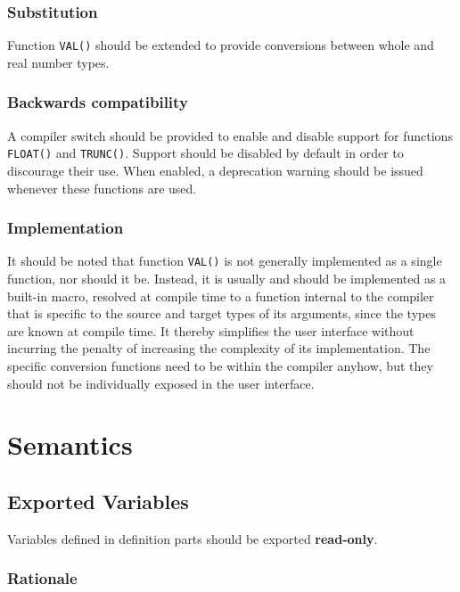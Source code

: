 \documentclass[10pt,a4paper]{article}
\begin{document}
\subsubsection{Substitution}

Function \verb|VAL()| should be extended to provide conversions between whole
and real number types.

\subsubsection{Backwards compatibility}

A compiler switch should be provided to enable and disable support for
functions \verb|FLOAT()| and \verb|TRUNC()|. Support should be disabled by
default in order to discourage their use. When enabled, a deprecation warning
should be issued whenever these functions are used.

\subsubsection{Implementation}
It should be noted that function \verb|VAL()| is not generally implemented as a
single function, nor should it be. Instead, it is usually and should be
implemented as a built-in macro, resolved at compile time to a function
internal to the compiler that is specific to the source and target types of its
arguments, since the types are known at compile time. It thereby simplifies the
user interface without incurring the penalty of increasing the complexity of
its implementation. The specific conversion functions need to be within the
compiler anyhow, but they should not be individually exposed in the user
interface.


\section{Semantics}

\subsection{Exported Variables}

Variables defined in definition parts should be exported \textbf{read-only}. 

\subsubsection{Rationale}
\end{document}
